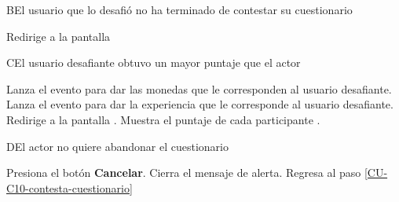 \begin{UCtrayectoriaA}%
  {B}{El usuario que lo desafió no ha terminado de contestar su cuestionario}

  \Sistema Redirige a la pantalla 

\end{UCtrayectoriaA}

\begin{UCtrayectoriaA}%
  {C}{El usuario desafiante obtuvo un mayor puntaje que el actor}

  \Sistema Lanza el evento para dar las monedas que le corresponden al usuario desafiante.
  \Sistema Lanza el evento para dar la experiencia que le corresponde al usuario desafiante.
  \Sistema Redirige a la pantalla .
  \Sistema Muestra el puntaje de cada participante .

\end{UCtrayectoriaA}

\begin{UCtrayectoriaA}{D}{El actor no quiere abandonar el cuestionario}

  \Actor Presiona el botón {\bf Cancelar}.
  \Sistema Cierra el mensaje de alerta.
  \Sistema Regresa al paso \ref{CU-C10-contesta-cuestionario}

\end{UCtrayectoriaA}
